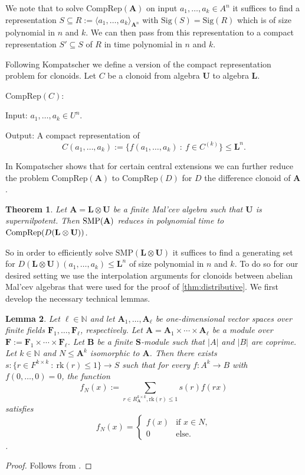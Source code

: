 \documentclass[12pt]{amsart}
\numberwithin{equation}{section}
\theoremstyle{plain}
\newtheorem{theorem}{Theorem}[section]
\newtheorem{lemma}[theorem]{Lemma}
\theoremstyle{definition}
\newcommand{\st}{\ :\ }
\newcommand{\A}{\mathbf{A}}
\newcommand{\B}{\mathbf{B}}
\newcommand{\F}{\mathbf{F}}
\renewcommand{\L}{\mathbf{L}}
\newcommand{\N}{\mathbb{N}}
\renewcommand{\S}{\mathbf{S}}
\newcommand{\U}{\mathbf{U}}
\newcommand{\rk}{\mathrm{rk}}
\newcommand{\SMP}{\text{SMP}}
\begin{document}
We note that to solve $\text{CompRep}(\A)$ on input $a_1, \dots, a_k \in A^n$ 
  it suffices to find a representation 
  $S \subseteq R:= \langle a_1, \dots , a_k \rangle_{\A^n}$ 
  with $\text{Sig}(S) = \text{Sig}(R)$ which is of size  polynomial in $n$ and $k$. 
We can then pass from this representation to a compact representation $S' \subseteq S$ of $R$ 
  in time polynomial in $n$ and $k$.

Following Kompatscher \cite{Kom:SMP} we define a version of the compact representation problem 
  for clonoids. 
Let $C$ be a clonoid from algebra $\U$ to algebra $\L$.

\noindent $\text{CompRep}(C)$:

\noindent \quad Input: $a_1, \ldots, a_k \in U^n$.

\noindent  \quad Output: A compact representation of 
\[C( a_1,\ldots,a_k):= \{f(a_1, \ldots, a_k) \st f \in C^{(k)} \} \le \L^n.\]


In \cite{Kom:SMP} Kompatscher shows that for certain central extensions we can further reduce 
  the problem $\text{CompRep}(\A)$ to $\text{CompRep}(D)$ for $D$ the difference clonoid of $\A$.

\begin{theorem}\cite[Theorem 11]{Kom:SMP}  \label{thm:comprep}
Let $\A = \L \otimes \U$ be a finite Mal'cev algebra such that $\U$ is supernilpotent. 
Then $\textup{SMP}(\A)$ reduces in polynomial time to $\textup{CompRep}(D(\L \otimes \U))$.
\end{theorem}

So in order to efficiently solve $\SMP(\L \otimes \U)$ it suffices to find a generating set for 
  $D(\L \otimes \U)(a_1, \ldots, a_k) \le \L^n$ of size polynomial in $n$ and $k$. 
To do so for our desired setting we use the interpolation arguments 
  for clonoids between abelian Mal'cev algebras that were used for the proof of \ref{thm:distributive}.
We first develop the necessary technical lemmas. 

\begin{lemma}  \label{lem:dps}
 Let $\ell \in \N$ and let $\A_1, \ldots, \A_\ell$ be one-dimensional vector spaces over finite fields $\F_1, \ldots, \F_\ell$, respectively.
 Let $\A = \A_1 \times \cdots \times \A_\ell$ be a module over $\F:= \F_1 \times \cdots \times \F_\ell$. 
 Let $\B$ be a finite $\S$-module such that $|A|$ and $|B|$ are coprime.
 Let $k\in\N$ and $N\leq\A^k$ isomorphic to $\A$.
 Then there exists $s\colon \{r\in F^{k\times k} \st \rk(r) \leq 1 \} \to S$ such that for every $f\colon A^{k}\to B$
  with $f(0,\dots,0)=0$, the function 
  \[ f_N(x) := \sum_{r\in R_\A^{k\times k}, \rk(r)\leq 1} s(r) f(rx) \]
  satisfies 
  \[f_N(x) = \begin{cases} f(x) & \text{if } x \in N, \\ 0 & \text{else.} \end{cases} \]. 
\end{lemma}
\begin{proof} 
  Follows from \cite[Corollary 3.5]{MaWy:CBM}.
\end{proof}
\end{document}
